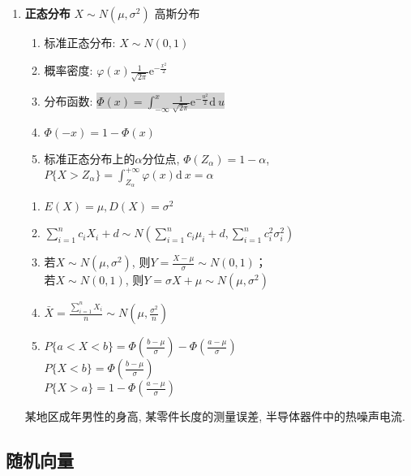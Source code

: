\documentclass[10pt,a4paper,nofonts]{ctexart}
\newcommand{\D}{\displaystyle}
\renewcommand{\d}{{\mathrm{d}\:\!}}
\newcommand{\e}{{\mathrm{e}}}
\begin{document}
\begin{multicols}{2}
\begin{enumerate}
\item {\bf 正态分布} $X\sim N(\mu,\sigma^2)$ 高斯分布\\
\fbox{$f(x)=\D\frac{1}{\sqrt{2\pi}\sigma}\e^{-\frac{(x-u)^2}{2\sigma^2}}$\\}
\begin{enumerate}
\item 标准正态分布: $X\sim N(0,1)$
\item 概率密度: $\varphi(x)\frac{1}{\sqrt{2\pi}}\e^{-\frac{x^2}{2}}$
\item 分布函数: \colorbox{lightgray}{$\varPhi(x)=\int_{-\infty}^{x}\frac{1}{\sqrt{2\pi}}\e^{-\frac{u^2}{2}}\d u$}
\item $\varPhi(-x)=1-\varPhi(x)$
\item 标准正态分布上的$\alpha$分位点, $\varPhi(Z_\alpha)=1-\alpha$, \\$P\{X>Z_\alpha\}=\int_{Z_\alpha}^{+\infty}\varphi(x)\d x=\alpha$
\end{enumerate}
\begin{enumerate}[label={\sf 性质\arabic*}]
\item $E(X)=\mu, D(X)=\sigma^2$
\item $\sum_{i=1}^{n}c_iX_i+d\sim N\left(\sum_{i=1}^{n}c_i\mu_i+d,\sum_{i=1}^{n}c_i^2\sigma_i^2\right)$
\item 若$X\sim N(\mu,\sigma^2)$, 则$Y=\frac{X-\mu}{\sigma}\sim N(0,1)$；\\
若$X\sim N(0,1)$, 则$Y=\sigma X+\mu\sim N(\mu,\sigma^2)$
\item $\bar{X}=\frac{\sum_{i=1}^{n}X_i}{n}\sim N(\mu, \frac{\sigma^2}{n})$
\item $P\{a<X<b\}=\varPhi (\frac{b-\mu}{\sigma} )-\varPhi (\frac{a-\mu}{\sigma} )$\\
$P\{X<b\}=\varPhi (\frac{b-\mu}{\sigma} )$\\
$P\{X>a\}=1-\varPhi (\frac{a-\mu}{\sigma} )$
\end{enumerate}
某地区成年男性的身高, 某零件长度的测量误差, 半导体器件中的热噪声电流.

\end{enumerate}

\subsection{随机向量}


\end{multicols}
\end{document}
